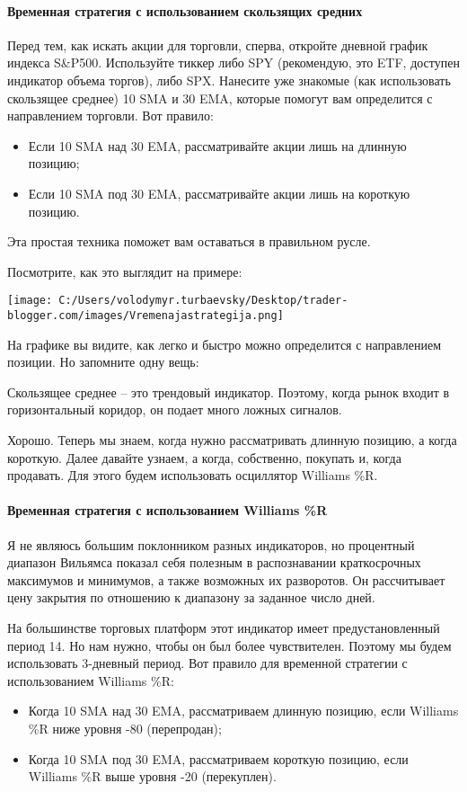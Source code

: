 \documentclass[a5paper]{article}
\begin{document}
\paragraph{Временная стратегия с использованием скользящих средних}

Перед тем, как искать акции для торговли, сперва, откройте дневной график индекса S\&P500. Используйте тиккер либо SPY (рекомендую, это ETF, доступен индикатор объема торгов), либо SPX. Нанесите уже знакомые (как использовать скользящее среднее) 10 SMA и 30 EMA, которые помогут вам определится с направлением торговли. Вот правило:
\begin{itemize}
\item     Если 10 SMA над 30 EMA, рассматривайте акции лишь на длинную позицию;
\item     Если 10 SMA под 30 EMA, рассматривайте акции лишь на короткую позицию.
\end{itemize}

Эта простая техника поможет вам оставаться в правильном русле.

Посмотрите, как это выглядит на примере:

\texttt{[image: C:/Users/volodymyr.turbaevsky/Desktop/trader-blogger.com/images/Vremenajastrategija.png]}

На графике вы видите, как легко и быстро можно определится с направлением позиции. Но запомните одну вещь:

Скользящее среднее – это трендовый индикатор. Поэтому, когда рынок входит в горизонтальный коридор, он подает много ложных сигналов.

Хорошо. Теперь мы знаем, когда нужно рассматривать длинную позицию, а когда короткую. Далее давайте узнаем, а когда, собственно, покупать и, когда продавать. Для этого будем использовать осциллятор Williams \%R.

\paragraph{Временная стратегия с использованием Williams \%R}

Я не являюсь большим поклонником разных индикаторов, но процентный диапазон Вильямса показал себя полезным в распознавании краткосрочных максимумов и минимумов, а также возможных их разворотов. Он рассчитывает цену закрытия по отношению к диапазону за заданное число дней.

На большинстве торговых платформ этот индикатор имеет предустановленный период 14. Но нам нужно, чтобы он был более чувствителен. Поэтому мы будем использовать 3-дневный период. Вот правило для временной стратегии с использованием Williams \%R:
\begin{itemize}
\item     Когда 10 SMA над 30 EMA, рассматриваем длинную позицию, если Williams \%R ниже уровня -80 (перепродан);
\item     Когда 10 SMA под 30 EMA, рассматриваем короткую позицию, если Williams \%R выше уровня -20 (перекуплен).
\end{itemize}
\end{document}
